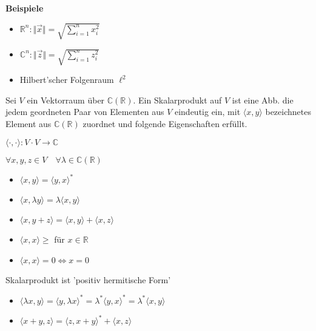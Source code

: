 
	\textbf{Beispiele}
	\begin{itemize}
		\item $\mathbb{R}^n: \Vert \vec x \Vert = \sqrt{\sum_{i=1}^n x_i^2}$
		\item $\mathbb{C}^n: \Vert \vec z \Vert = \sqrt{\sum_{i=1}^n z_i^2}$
		\item Hilbert'scher Folgenraum $\ell^2$
	\end{itemize}

	\begin{Def}
		Sei $V$ ein Vektorraum über $\mathbb{C} (\mathbb{R})$.
		Ein Skalarprodukt auf $V$ ist eine Abb. die jedem geordneten Paar von
		Elementen aus $V$ eindeutig ein, mit $\langle x,y\rangle$ bezeichnetes Element aus
		$\mathbb{C} (\mathbb{R})$ zuordnet und folgende Eigenschaften erfüllt.

		$\langle\cdot,\cdot \rangle: V\cdot V \rightarrow \mathbb{C}$ 
		
		$\forall x,y,z \in V \quad \forall \lambda \in \mathbb{C} (\mathbb{R})$

		\begin{itemize}
			\item $\langle x,y\rangle = \langle y,x\rangle^\ast$
			\item $\langle x,\lambda y\rangle = \lambda \langle x,y\rangle$
			\item $\langle x,y+z\rangle = \langle x,y\rangle + \langle x,z\rangle$
			\item $\langle x,x\rangle \geq$ für $ x \in \mathbb{R}$
			\item $\langle x,x\rangle = 0 \Leftrightarrow x=0$
		\end{itemize}
	\end{Def}

	\begin{Bem}
		Skalarprodukt ist 'positiv hermitische Form'
		\begin{itemize}
			\item $\langle \lambda x,y\rangle = \langle y,\lambda x\rangle^\ast = \lambda^\ast \langle y, x\rangle^\ast=
					\lambda^\ast \langle x,y\rangle$
			\item $\langle x+y,z\rangle = \langle z,x+y\rangle^\ast + \langle x,z\rangle$
		\end{itemize}
	\end{Bem}

